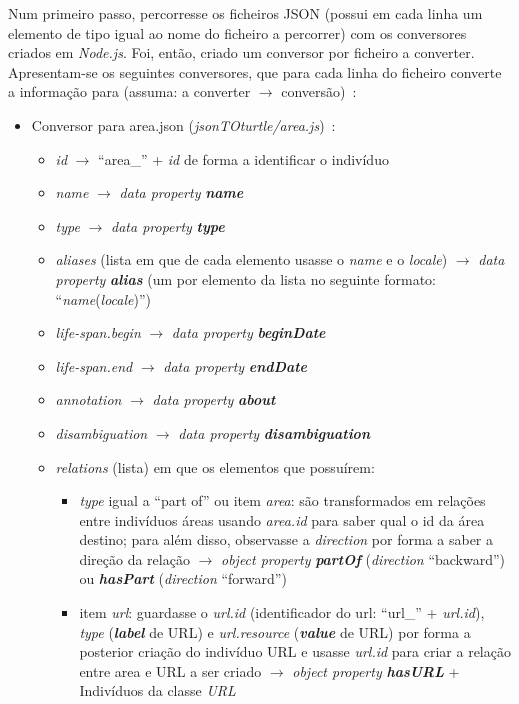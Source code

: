 \documentclass{article}
\begin{document}
Num primeiro passo, percorresse os ficheiros JSON (possui em cada linha um elemento de tipo igual ao nome do ficheiro a percorrer) com os conversores criados em \textit{Node.js}. Foi, então, criado um conversor por ficheiro a converter. Apresentam-se os seguintes conversores, que para cada linha do ficheiro converte a informação para (assuma: a converter $\to$ conversão)~\cite{mbSchema,mbRels}:
\begin{itemize}
    \item Conversor para area.json (\textit{jsonTOturtle/area.js})~\cite{mbAr}:
        \begin{itemize}
            \item \textit{id} $\to$ ``area\_'' + \textit{id} de forma a identificar o indivíduo
            \item \textit{name} $\to$ \textit{data property} \textit{\textbf{name}}
            \item \textit{type} $\to$ \textit{data property} \textit{\textbf{type}}
            \item \textit{aliases} (lista em que de cada elemento usasse o \textit{name} e o \textit{locale}) $\to$ \textit{data property} \textit{\textbf{alias}} (um por elemento da lista no seguinte formato: ``\textit{name}(\textit{locale})'')
            \item \textit{life-span.begin} $\to$ \textit{data property} \textit{\textbf{beginDate}}
            \item \textit{life-span.end} $\to$ \textit{data property} \textit{\textbf{endDate}}
            \item \textit{annotation} $\to$ \textit{data property} \textit{\textbf{about}}
            \item \textit{disambiguation} $\to$ \textit{data property} \textit{\textbf{disambiguation}}
            \item \textit{relations} (lista) em que os elementos que possuírem:
                \begin{itemize}
                    \item \textit{type} igual a ``part of'' ou item \textit{area}: são transformados em relações entre indivíduos áreas usando \textit{area.id} para saber qual o id da área destino; para além disso, observasse a \textit{direction} por forma a saber a direção da relação $\to$ \textit{object property} \textit{\textbf{partOf}} (\textit{direction} ``backward'') ou \textit{\textbf{hasPart}} (\textit{direction} ``forward'')
                    \item item \textit{url}: guardasse o \textit{url.id} (identificador do url: ``url\_'' + \textit{url.id}), \textit{type} (\textit{\textbf{label}} de URL) e \textit{url.resource} (\textit{\textbf{value}} de URL) por forma a posterior criação do indivíduo URL e usasse \textit{url.id} para criar a relação entre area e URL a ser criado $\to$ \textit{object property} \textit{\textbf{hasURL}} + Indivíduos da classe \textit{URL}

\end{itemize}
\end{itemize}
\end{itemize}
\end{document}
